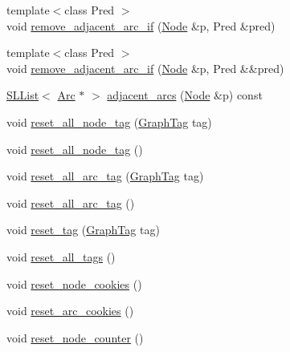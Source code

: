 \begin{DoxyCompactItemize}
{\footnotesize template$<$class Pred $>$ }\\void \hyperlink{class_designar_1_1_base_graph_af1653bc8e50c53d27997951798a8a716}{remove\+\_\+adjacent\+\_\+arc\+\_\+if} (\hyperlink{namespace_designar_a5af326c65aa2bd26b26c410f2030d09e}{Node} \&p, Pred \&pred)
\item 
{\footnotesize template$<$class Pred $>$ }\\void \hyperlink{class_designar_1_1_base_graph_a10423075ea81c629e88974fa882ec903}{remove\+\_\+adjacent\+\_\+arc\+\_\+if} (\hyperlink{namespace_designar_a5af326c65aa2bd26b26c410f2030d09e}{Node} \&p, Pred \&\&pred)
\item 
\hyperlink{class_designar_1_1_s_l_list}{S\+L\+List}$<$ \hyperlink{namespace_designar_a3f55fb5513d62ff47cbc8f72b8e95d6f}{Arc} $\ast$ $>$ \hyperlink{class_designar_1_1_base_graph_a2c91912381c8220c0b2530e5ad187231}{adjacent\+\_\+arcs} (\hyperlink{namespace_designar_a5af326c65aa2bd26b26c410f2030d09e}{Node} \&p) const
\item 
void \hyperlink{class_designar_1_1_base_graph_a07ca1909d77210157b8b9571a4d35d6c}{reset\+\_\+all\+\_\+node\+\_\+tag} (\hyperlink{namespace_designar_ac91366256ea6ea6ac5fd483d55a7499e}{Graph\+Tag} tag)
\item 
void \hyperlink{class_designar_1_1_base_graph_a7bffa4f055b15f76d12bd7c40730a3dd}{reset\+\_\+all\+\_\+node\+\_\+tag} ()
\item 
void \hyperlink{class_designar_1_1_base_graph_ab73705a167e91d0982a9f149b1d7e71b}{reset\+\_\+all\+\_\+arc\+\_\+tag} (\hyperlink{namespace_designar_ac91366256ea6ea6ac5fd483d55a7499e}{Graph\+Tag} tag)
\item 
void \hyperlink{class_designar_1_1_base_graph_af9ae2a4dfd676090de4b4fa04414989c}{reset\+\_\+all\+\_\+arc\+\_\+tag} ()
\item 
void \hyperlink{class_designar_1_1_base_graph_ae8845b2eb9d33f62684c8e5acc7c91b7}{reset\+\_\+tag} (\hyperlink{namespace_designar_ac91366256ea6ea6ac5fd483d55a7499e}{Graph\+Tag} tag)
\item 
void \hyperlink{class_designar_1_1_base_graph_ae62e72668468a2aaa3ddc91246e1ee1c}{reset\+\_\+all\+\_\+tags} ()
\item 
void \hyperlink{class_designar_1_1_base_graph_ab797f80e7efa5a6d0b33f925d6079c18}{reset\+\_\+node\+\_\+cookies} ()
\item 
void \hyperlink{class_designar_1_1_base_graph_a44b6cefb8966ed69a0d80bfe7e4546cb}{reset\+\_\+arc\+\_\+cookies} ()
\item 
void \hyperlink{class_designar_1_1_base_graph_a53603f64b51b470cc6b8c8d6d2b643a4}{reset\+\_\+node\+\_\+counter} ()

\end{DoxyCompactItemize}
